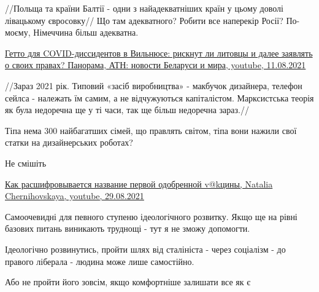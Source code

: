 \begin{itemize}
\begin{itemize}
 
//Польща та країни Балтії - одни з найадекватніших країн у цьому доволі лівацькому євросовку//
Що там адекватного?
Робити все наперекір Росії?
По-моєму, Німеччина більш адекватна.

\href{https://youtu.be/VXxHrAbPPUY}{%
Гетто для COVID-диссидентов в Вильнюсе: рискнут ли литовцы и далее заявлять о своих правах? Панорама, %
АТН: новости Беларуси и мира, youtube, 11.08.2021%
}

 
//Зараз 2021 рік. Типовий «засіб виробництва» - макбучок дизайнера, телефон
сейлса - належать їм самим, а не відчужуються капіталістом. Марксистська теорія
як була недоречна ще у ті часи, так ще більш недоречна зараз.//

Тіпа нема 300 найбагатших сімей, що правлять світом, тіпа вони нажили свої статки на дизайнерських роботах?

Не смішіть

\href{https://youtu.be/Q8bncksDUAE}{%
Как расшифровывается название первой одобренной v@kцины, %
Natalia Chernihovskaya, youtube, %
29.08.2021%
}

 

Самоочевидні для певного ступеню ідеологічного розвитку. Якщо ще на рівні
базових питань виникають труднощі - тут я не зможу допомогти.

Ідеологічно розвинутись, пройти шлях від сталініста - через соціалізм - до
правого ліберала - людина може лише самостійно.

Або не пройти його зовсім, якщо комфортніше залишати все як є


 


\end{itemize}
\end{itemize}

